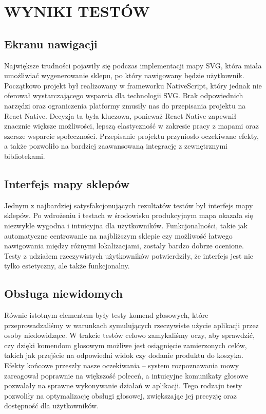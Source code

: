 \chapter{WYNIKI TESTÓW}
\label{chapter:wyniki_testow}

\section{Ekranu nawigacji} 
Największe trudności pojawiły się podczas implementacji mapy SVG, która miała umożliwiać wygenerowanie sklepu, po który nawigowany będzie użytkownik. Początkowo projekt był realizowany w frameworku NativeScript, który jednak nie oferował wystarczającego wsparcia dla technologii SVG. Brak odpowiednich narzędzi oraz ograniczenia platformy zmusiły nas do przepisania projektu na React Native. Decyzja ta była kluczowa, ponieważ React Native zapewnił znacznie większe możliwości, lepszą elastyczność w zakresie pracy z mapami oraz szersze wsparcie społeczności. Przepisanie projektu przyniosło oczekiwane efekty, a także pozwoliło na bardziej zaawansowaną integrację z zewnętrznymi bibliotekami.

\section{Interfejs mapy sklepów} 
Jednym z najbardziej satysfakcjonujących rezultatów testów był interfejs mapy sklepów. Po wdrożeniu i testach w środowisku produkcyjnym mapa okazała się niezwykle wygodna i intuicyjna dla użytkowników. Funkcjonalności, takie jak automatyczne centrowanie na najbliższym sklepie czy możliwość łatwego nawigowania między różnymi lokalizacjami, zostały bardzo dobrze ocenione. Testy z udziałem rzeczywistych użytkowników potwierdziły, że interfejs jest nie tylko estetyczny, ale także funkcjonalny.

\section{Obsługa niewidomych} 
Równie istotnym elementem były testy komend głosowych, które przeprowadzaliśmy w warunkach symulujących rzeczywiste użycie aplikacji przez osoby niedowidzące. W trakcie testów celowo zamykaliśmy oczy, aby sprawdzić, czy dzięki komendom głosowym możliwe jest osiągnięcie zamierzonych celów, takich jak przejście na odpowiedni widok czy dodanie produktu do koszyka. Efekty końcowe przeszły nasze oczekiwania – system rozpoznawania mowy zareagował poprawnie na większość poleceń, a intuicyjne komunikaty głosowe pozwalały na sprawne wykonywanie działań w aplikacji. Tego rodzaju testy pozwoliły na optymalizację obsługi głosowej, zwiększając jej precyzję oraz dostępność dla użytkowników.